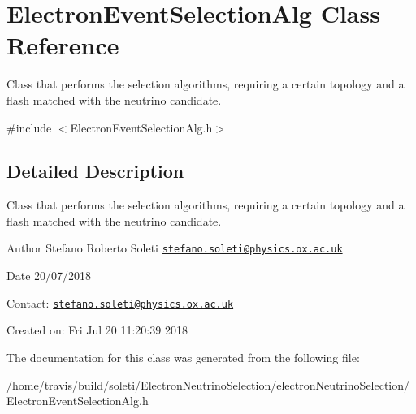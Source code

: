 \hypertarget{classElectronEventSelectionAlg}{\section{Electron\-Event\-Selection\-Alg Class Reference}
\label{classElectronEventSelectionAlg}
}


Class that performs the selection algorithms, requiring a certain topology and a flash matched with the neutrino candidate.  




{\ttfamily \#include $<$Electron\-Event\-Selection\-Alg.\-h$>$}



\subsection{Detailed Description}
Class that performs the selection algorithms, requiring a certain topology and a flash matched with the neutrino candidate. 

\begin{DoxyAuthor}{Author}
Stefano Roberto Soleti \href{mailto:stefano.soleti@physics.ox.ac.uk}{\tt stefano.\-soleti@physics.\-ox.\-ac.\-uk}
\end{DoxyAuthor}
\begin{DoxyDate}{Date}
20/07/2018
\end{DoxyDate}
Contact\-: \href{mailto:stefano.soleti@physics.ox.ac.uk}{\tt stefano.\-soleti@physics.\-ox.\-ac.\-uk}

Created on\-: Fri Jul 20 11\-:20\-:39 2018 

The documentation for this class was generated from the following file\-:\begin{DoxyCompactItemize}
\item 
/home/travis/build/soleti/\-Electron\-Neutrino\-Selection/electron\-Neutrino\-Selection/Electron\-Event\-Selection\-Alg.\-h\end{DoxyCompactItemize}
